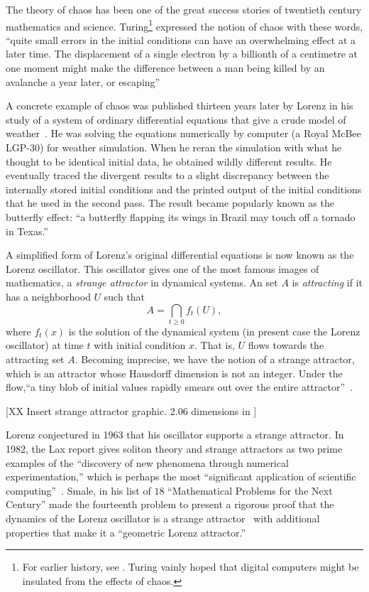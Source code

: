 \documentclass{llncs}
\begin{document}
The theory of chaos has been one of the great success stories of
twentieth century mathematics and science.   Turing\footnote{For
  earlier history, see \cite[p.~971]{Wolfram:NKS}. Turing vainly hoped that
  digital computers might be insulated from the effects of chaos.}
expressed the notion of chaos with these words, ``quite small errors
in the initial conditions can have an overwhelming effect at a later
time.  The displacement of a single electron by a billionth of a
centimetre at one moment might make the difference between a man being
killed by an avalanche a year later, or escaping''~\cite{Tu50}

A concrete example of chaos was published thirteen years later by
Lorenz in his study of a system of ordinary differential equations
that give a crude model of weather~\cite{Lo63}.  He was solving the
equations numerically by computer (a Royal McBee LGP-30) for weather
simulation.  When he reran the simulation with what he thought to be
identical initial data, he obtained wildly different results.  He
eventually traced the divergent results to a slight discrepancy
between the internally stored initial conditions and the printed
output of the initial conditions that he used in the second pass.  The
result became popularly known as the butterfly effect: ``a butterfly
flapping its wings in Brazil may touch off a tornado in Texas.''

A simplified form of Lorenz's original differential equations is now
known as the Lorenz oscillator.  This oscillator gives one of the most
famous images of mathematics, a {\it strange attractor} in dynamical
systems.  An {set} $A$ is {\it attracting} if it has a neighborhood
$U$ such that
\[
A = \bigcap_{t\ge 0} f_t(U),
\]
where $f_t(x)$ is the solution of the dynamical system (in present
case the Lorenz oscillator) at time $t$ with initial condition
$x$. That is, $U$ flows towards the attracting set $A$.  Becoming
imprecise, we have the notion of a strange attractor, which is an
attractor whose Hausdorff dimension is not an integer.  Under the
flow,``a tiny blob of initial values rapidly smears out over the
entire attractor''~\cite{WT}.

% 

[XX Insert strange attractor graphic. 2.06 dimensions in ]


Lorenz conjectured in 1963 that his oscillator supports a strange
attractor.  In 1982, the Lax report gives soliton theory and strange
attractors as two prime examples of the ``discovery of new phenomena
through numerical experimentation,'' which is perhaps the most
``significant application of scientific computing''~\cite{Lax}.
Smale, in his list of $18$ ``Mathematical Problems for the Next
Century'' made the fourteenth problem to present a rigorous proof that
the dynamics of the Lorenz oscillator is a strange
attractor~\cite{Sma98} with additional properties that make it a
``geometric Lorenz attractor.''
\end{document}
